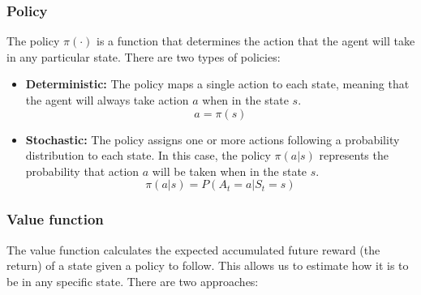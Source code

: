 \subsubsection*{Policy}

The policy $\pi(\cdot)$ is a function that determines the action that the agent will take in any particular state. There are two types of policies:

\begin{itemize}
    \item \textbf{Deterministic:} The policy maps a single action to each state, meaning that the agent will always take action $a$ when in the state $s$.
    \begin{equation}
        a = \pi(s)
    \end{equation}
    \item \textbf{Stochastic:} The policy assigns one or more actions following a probability distribution to each state. In this case, the policy $\pi(a|s)$ represents the probability that action $a$ will be taken when in the state $s$.
    \begin{equation}
        \pi(a|s) = P(A_t=a|S_t=s)
    \end{equation}
\end{itemize}

\subsubsection*{Value function}

The value function calculates the expected accumulated future reward (the return) of a state given a policy to follow. This allows us to estimate how  it is to be in any specific state. There are two approaches:

